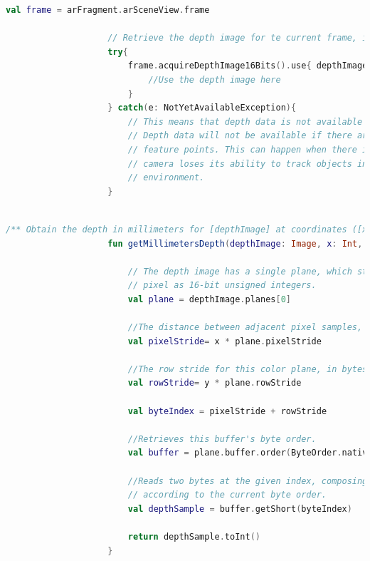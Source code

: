\documentclass[crop=false, class=book]{standalone}
\begin{document}
		\begin{center}
				\begin{minipage}{0.95\textwidth}
					\begin{lstlisting}[caption={ Estrazione di un'immagine profonda}, label={lst: depth-image}, 		language=Kotlin]
					val frame = arFragment.arSceneView.frame

					// Retrieve the depth image for te current frame, if available
					try{
						frame.acquireDepthImage16Bits().use{ depthImage ->
							//Use the depth image here
						}
					} catch(e: NotYetAvailableException){
						// This means that depth data is not available yet.
  						// Depth data will not be available if there are no tracked
  						// feature points. This can happen when there is no motion, or when the
  						// camera loses its ability to track objects in the surrounding
  						// environment. 
					}
					
					\end{lstlisting}
			\end{minipage}
		\end{center}
		\clearpage
		\begin{center}
				\begin{minipage}{0.95\textwidth}
					\begin{lstlisting}[caption={ Estrazione di informazioni da un'immagine profonda}, label={lst: inf-depth-img}, 		language=Kotlin]
					/** Obtain the depth in millimeters for [depthImage] at coordinates ([x], [y]). */
					fun getMillimetersDepth(depthImage: Image, x: Int, y: Int): Int {
					
  						// The depth image has a single plane, which stores depth for each
  						// pixel as 16-bit unsigned integers.
  						val plane = depthImage.planes[0]
  						
  						//The distance between adjacent pixel samples, in bytes
  						val pixelStride= x * plane.pixelStride
  						
  						//The row stride for this color plane, in bytes.
  						val rowStride= y * plane.rowStride
  						
  						val byteIndex = pixelStride + rowStride 
  						
  						//Retrieves this buffer's byte order. 
  						val buffer = plane.buffer.order(ByteOrder.nativeOrder())
  					
  						//Reads two bytes at the given index, composing them into a short value
  						// according to the current byte order.
  						val depthSample = buffer.getShort(byteIndex)
  						
  						return depthSample.toInt()
					}
					
					\end{lstlisting}
			\end{minipage}
		\end{center}
		
\end{document}
